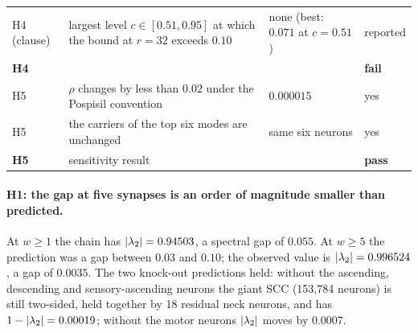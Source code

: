 \begin{table}[t]
\begin{tabular}{@{}l>{\raggedright\arraybackslash}p{7.5cm}>{\raggedright\arraybackslash}p{3.4cm}l@{}}
H4 (clause) & largest level $c\in[0.51,0.95]$ at which the bound at $r=32$ exceeds $0.10$ & none (best: $0.071$ at $c=0.51$) & reported \\
\textbf{H4} & & & \textbf{fail} \\
\addlinespace
H5 & $\rho$ changes by less than $0.02$ under the Pospisil convention & $0.000015$ & yes \\
H5 & the carriers of the top six modes are unchanged & same six neurons & yes \\
\textbf{H5} & sensitivity result & & \textbf{pass} \\
\bottomrule
\end{tabular}
\end{table}

\paragraph{H1: the gap at five synapses is an order of magnitude smaller than predicted.}
At $w\ge1$ the chain has $\lvert\lambda_2\rvert=0.94503$, a spectral gap of $0.055$. At $w\ge5$ the prediction
was a gap between $0.03$ and $0.10$; the observed value is $\lvert\lambda_2\rvert=0.996524$, a gap of $0.0035$.
The two knock-out predictions held: without the ascending, descending and sensory-ascending neurons
the giant SCC (153{,}784 neurons) is still two-sided, held together by 18 residual neck neurons, and
has $1-\lvert\lambda_2\rvert=0.00019$; without the motor neurons $\lvert\lambda_2\rvert$ moves by $0.0007$.

